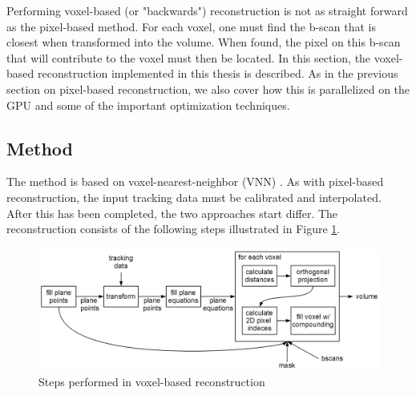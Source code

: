 Performing voxel-based (or "backwards") reconstruction is not as straight forward as the pixel-based method. For each voxel, one must find the b-scan that is closest when transformed into the volume. When found, the pixel on this b-scan that will contribute to the voxel must then be located. In this section, the voxel-based reconstruction implemented in this thesis is described. As in the previous section on pixel-based reconstruction, we also cover how this is parallelized on the GPU and some of the important optimization techniques.

\subsection{Method}

	
The method is based on voxel-nearest-neighbor (VNN) \cite{sherebrin1996}. As with pixel-based reconstruction, the input tracking data must be calibrated and interpolated. After this has been completed, the two approaches start differ. The reconstruction consists of the following steps illustrated in Figure \ref{fig:non-inc_vnn}.

	\begin{figure}[h]
	\centering
	\includegraphics[width=\textwidth]{graphics/non-inc_vnn.png}
	\caption{Steps performed in voxel-based reconstruction}
	\label{fig:non-inc_vnn}
	\end{figure}

